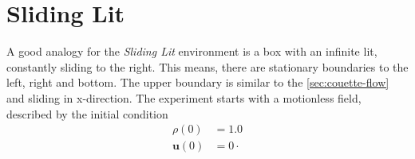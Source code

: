 \section{Sliding Lit}\label{sec:sliding-lit}
A good analogy for the \textit{Sliding Lit} environment is a box with an infinite lit, constantly sliding to the right.
This means, there are stationary boundaries to the left, right and bottom.
The upper boundary is similar to the \cref{sec:couette-flow} and sliding in x-direction.
The experiment starts with a motionless field, described by the initial condition
\begin{equation*}
    \begin{aligned}
        \rho(0) &= 1.0 \\
        \mathbf{u}(0) &= 0 \cdot
    \end{aligned}
\end{equation*}

